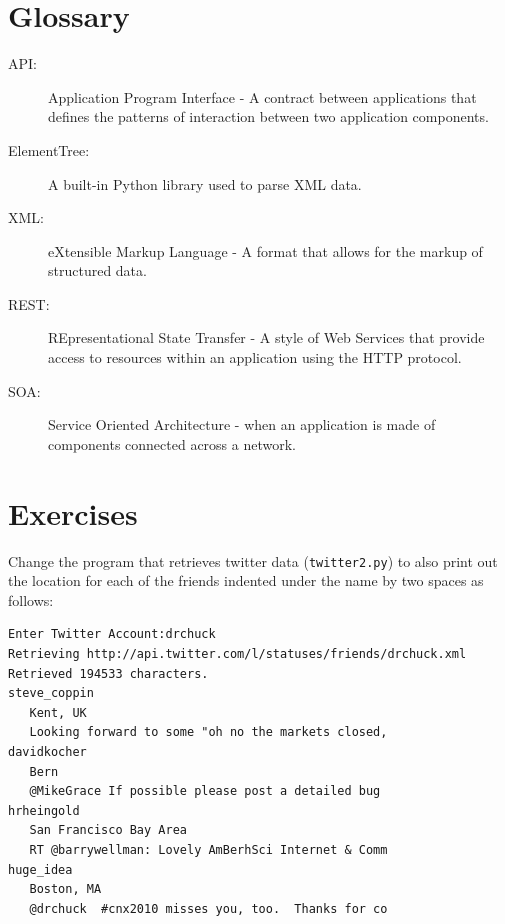\documentclass[10pt]{book}
\begin{document}
\section{Glossary}

\begin{description}

\item[API:] Application Program Interface - A contract between
applications that defines the patterns of interaction between 
two application components.

\item[ElementTree:] A built-in Python library used to parse XML data.

\item[XML:] eXtensible Markup Language - A format that allows for 
the markup of structured data.

\item[REST:] REpresentational State Transfer - A style of Web Services 
that provide access to resources within an application using the HTTP
protocol.

\item[SOA:] Service Oriented Architecture - when an application is 
made of components connected across a network.

\end{description}

\section{Exercises}

\begin{ex}
Change the program that retrieves twitter data 
({\tt twitter2.py}) to also
print out the location for each of the friends
indented under the name by two spaces as follows:

\beforeverb
\begin{verbatim}
Enter Twitter Account:drchuck
Retrieving http://api.twitter.com/l/statuses/friends/drchuck.xml
Retrieved 194533 characters.
steve_coppin
   Kent, UK
   Looking forward to some "oh no the markets closed,
davidkocher
   Bern
   @MikeGrace If possible please post a detailed bug 
hrheingold
   San Francisco Bay Area
   RT @barrywellman: Lovely AmBerhSci Internet & Comm
huge_idea
   Boston, MA
   @drchuck  #cnx2010 misses you, too.  Thanks for co
\end{verbatim}
\afterverb
%
\end{ex}
\end{document}
